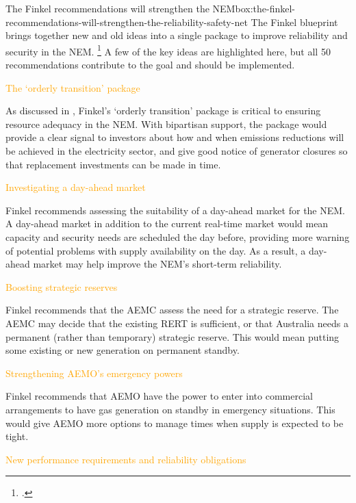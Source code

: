 \documentclass[FrontPage]{grattan}
\newenvironment{alphafootnotes}{}{}
\begin{document}
\begin{bigbox*}{The Finkel recommendations will strengthen the NEM}{box:the-finkel-recommendations-will-strengthen-the-reliability-safety-net}
\setlength{\parskip}{6pt}
\setlength{\intextsep}{6pt}
\begin{alphafootnotes}
The Finkel blueprint brings together new and old ideas into a single package to improve reliability and security in the NEM\@.%
\footcite[][]{Finkel2017ReviewFinal}
A few of the key ideas are highlighted here, but all 50 recommendations contribute to the goal and should be implemented.

\textcolor{Orange}{The `orderly transition' package}

As discussed in , Finkel's `orderly transition' package is critical to ensuring resource adequacy in the NEM\@. With bipartisan support, the package would provide a clear signal to investors about how and when emissions reductions will be achieved in the electricity sector, and give good notice of generator closures so that replacement investments can be made in time.

\textcolor{Orange}{Investigating a day-ahead market}

Finkel recommends assessing the suitability of a day-ahead market for the NEM\@. A day-ahead market in addition to the current real-time market would mean capacity and security needs are scheduled the day before, providing more warning of potential problems with supply availability on the day. As a result, a day-ahead market may help improve the NEM's short-term reliability.

\textcolor{Orange}{Boosting strategic reserves}

Finkel recommends that the AEMC assess the need for a strategic reserve. The AEMC may decide that the existing RERT is sufficient, or that Australia needs a permanent (rather than temporary) strategic reserve. This would mean putting some existing or new generation on permanent standby.

\textcolor{Orange}{Strengthening AEMO's emergency powers}

Finkel recommends that AEMO have the power to enter into commercial arrangements to have gas generation on standby in emergency situations. This would give AEMO more options to manage times when supply is expected to be tight.

\textcolor{Orange}{New performance requirements and reliability obligations}


\end{alphafootnotes}
\end{bigbox*}
\end{document}
